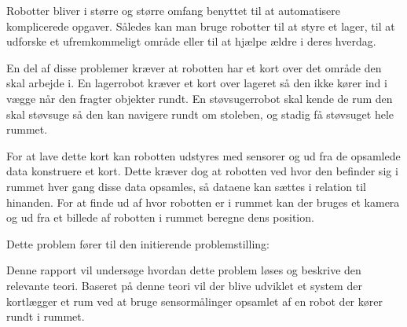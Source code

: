 Robotter bliver i større og større omfang benyttet til at automatisere komplicerede opgaver.
Således kan man bruge robotter til at styre et lager, til at udforske et ufremkommeligt område eller til at hjælpe ældre i deres hverdag.

En del af disse problemer kræver at robotten har et kort over det område den skal arbejde i.
En lagerrobot kræver et kort over lageret så den ikke kører ind i vægge når den fragter objekter rundt.
En støvsugerrobot skal kende de rum den skal støvsuge så den kan navigere rundt om stoleben, og stadig få støvsuget hele rummet.

For at lave dette kort kan robotten udstyres med sensorer og ud fra de opsamlede data konstruere et kort.
Dette kræver dog at robotten ved hvor den befinder sig i rummet hver gang disse data opsamles, så dataene kan sættes i relation til hinanden.
For at finde ud af hvor robotten er i rummet kan der bruges et kamera og ud fra et billede af robotten i rummet beregne dens position.

Dette problem fører til den initierende problemstilling:

Denne rapport vil undersøge hvordan dette problem løses og beskrive den relevante teori.
Baseret på denne teori vil der blive udviklet et system der kortlægger et rum ved at bruge sensormålinger opsamlet af en robot der kører rundt i rummet.



